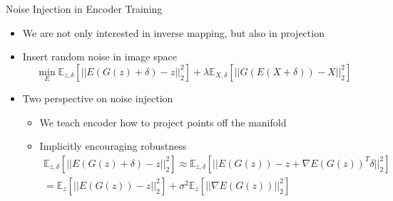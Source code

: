 \documentclass[10pt]{beamer}
\begin{document}
\begin{frame}[fragile]{Noise Injection in Encoder Training}
    \begin{itemize}
        \item We are not only interested in inverse mapping, but also in projection
        
        \item Insert random noise in image space
        \begin{equation*}
            \min_{E} \mathbb{E}_{z, \delta} [||E(G(z) + \delta) - z||_2^2] + \lambda \mathbb{E}_{X, \delta} [||G(E(X + \delta)) - X||_2^2]
        \end{equation*}
        
        \item Two perspective on noise injection
        \begin{itemize}
            \item We teach encoder how to project points off the manifold
            \item Implicitly encouraging robustness
            \begin{align*}
                \mathbb{E}_{z, \delta} [||E(G(z) + \delta) - z||_2^2] \approx \mathbb{E}_{z, \delta} [||E(G(z)) - z + \nabla E(G(z))^T \delta||_2^2] \\
                = \mathbb{E}_{z} [||E(G(z)) - z||_2^2] + \sigma^2 \mathbb{E}_{z} [||\nabla E(G(z))||_2^2]
            \end{align*}
        \end{itemize}
    \end{itemize}
\end{frame}
\end{document}
